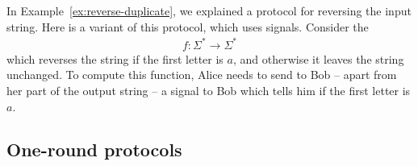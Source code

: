 

\begin{myexample}
    In Example~\ref{ex:reverse-duplicate}, we explained a protocol for reversing the input string. Here is a variant of this protocol, which uses signals. Consider the 
    \begin{align*}
    f : \Sigma^* \to \Sigma^*
    \end{align*}
    which reverses the string if the first letter is $a$, and otherwise it leaves the string unchanged. To compute this function, Alice needs to send to Bob -- apart from her part of the output string -- a signal to Bob which tells him if the first letter is $a$.
\end{myexample}



\subsection{One-round protocols}

